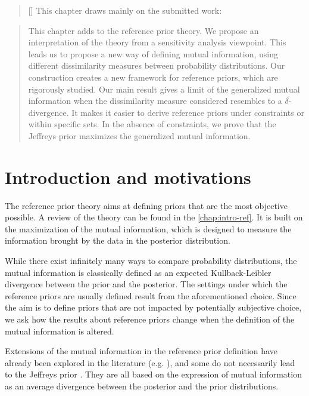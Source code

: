 
\begin{abstract}[\hspace*{-10pt}]
    This chapter draws mainly on the submitted work:   %
\end{abstract}

\begin{abstract}
    This chapter adds to the reference prior theory. We propose an interpretation of the theory from a sensitivity analysis viewpoint. This leads us to propose a new way of defining mutual information, using different dissimilarity measures between probability distributions. 
    Our construction  creates a new framework for reference priors, which are rigorously studied.
    Our main result gives a limit of the generalized mutual information when the dissimilarity measure considered resembles to a $\delta$-divergence.
    It makes it easier to derive reference priors under constraints or within specific sets. In the absence of constraints, we prove that the Jeffreys prior maximizes the generalized mutual information.
\end{abstract}

\minitoc

\section{Introduction and motivations}

The reference prior theory aims at defining priors that are the most objective possible. A review of the theory can be found in the \cref{chap:intro-ref}. It is built on the maximization of the mutual information, which is designed to measure the information brought by the data in the posterior distribution.

While there exist infinitely many ways to compare probability distributions, the mutual information is classically defined as an expected Kullback-Leibler divergence between the prior and the posterior.
The settings under which the reference priors are usually defined result from the aforementioned choice. Since the aim is to define priors that are not impacted by potentially subjective choice, we ask how the results about reference priors change when the definition of the mutual information is altered.

Extensions of the mutual information in the reference prior definition have already been explored in the literature (e.g. \cite{chen_objective_2010,liu_divergence_2014,le_formal_2014}), and some do not necessarily lead to the Jeffreys prior \citep{hashimoto_reference_2021,clarke_reference_1997,ghosh_general_2011}. They are all based on the expression of mutual information as an average divergence between the posterior and the prior distributions.





